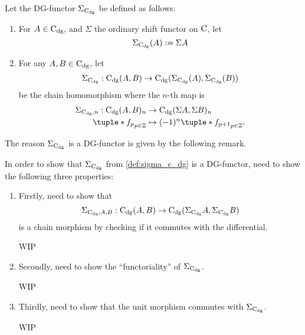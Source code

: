 \begin{definition}[\( \Sigma_{\C_{\dg}} \)]
    \label{def:sigma_c_dg}
    Let the DG-functor \( \Sigma_{\C_{\dg}} \) be defined as follows:
    \begin{enumerate}
        \item {
            For \( A \in \operatorname{C}_{\operatorname{dg}} \), and \( \Sigma \) the ordinary shift functor on \( \operatorname{C} \), let
            \[
                \Sigma_{\operatorname{C}_{\operatorname{dg}}}(A) := \Sigma A
            \]
        }
        \item {
            For any \( A, B \in \operatorname{C}_{\operatorname{dg}} \), let
            \begin{align*}
                \Sigma_{\operatorname{C}_{\operatorname{dg}}}: \operatorname{C}_{\operatorname{dg}}(A, B) \to \operatorname{C}_{\operatorname{dg}}(\Sigma_{\operatorname{C}_{\operatorname{dg}}}(A), \Sigma_{\operatorname{C}_{\operatorname{dg}}}(B))
            \end{align*}
            be the chain homomorphism where the \( n \)-th map is
            \begin{align*}
                \Sigma_{\C_{\dg}, n}: \C_{\dg}(A, B)_n &\to \C_{\dg}(\Sigma A, \Sigma B)_n \\
                \tuple*{ f_p }_{p \in \Zb} &\mapsto (-1)^n \tuple*{ f_{p + 1} }_{p \in \Zb}.
            \end{align*}
        }
    \end{enumerate}
\end{definition}

The reason \( \Sigma_{\C_{\dg}} \) is a DG-functor is given by the following remark. 

\begin{remark}
    In order to show that \( \Sigma_{\C_{\dg}} \) from \autoref{def:sigma_c_dg} is a DG-functor, need to show the following three properties:
    \begin{enumerate}
        \item {
            Firstly, need to show that
            \[
                \Sigma_{\operatorname{C}_{\operatorname{dg}}, A, B}: \operatorname{C}_{\operatorname{dg}}(A, B) \to \operatorname{C}_{\operatorname{dg}}(\Sigma_{\operatorname{C}_{\operatorname{dg}}} A, \Sigma_{\operatorname{C}_{\operatorname{dg}}} B)
            \]
            is a chain morphism by checking if it commutes with the differential.

            WIP
        }
        \item {
            Secondly, need to show the ``functoriality'' of \( \Sigma_{\C_{\dg}} \).

            WIP
        }
        \item {
            Thirdly, need to show that the unit morphism commutes with \( \Sigma_{\C_{\dg}} \).

            WIP
        }
    \end{enumerate}
\end{remark}

